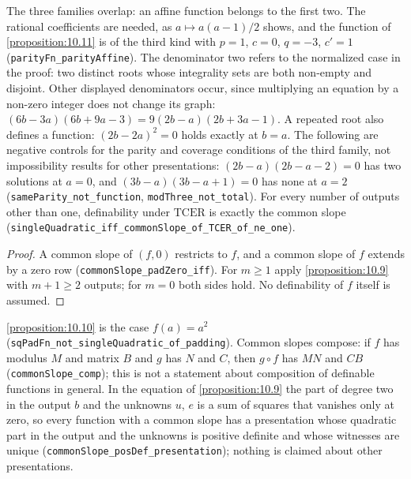The three families overlap: an affine function belongs to the first two. The rational coefficients are needed, as $a ↦ a(a - 1)/2$ shows, and the function of \cref{proposition:10.11} is of the third kind with $p = 1$, $c = 0$, $q = -3$, $c' = 1$ (\texttt{parityFn\_parityAffine}). The denominator two refers to the normalized case in the proof: two distinct roots whose integrality sets are both non-empty and disjoint. Other displayed denominators occur, since multiplying an equation by a non-zero integer does not change its graph: $(6b - 3a)(6b + 9a - 3) = 9(2b - a)(2b + 3a - 1)$. A repeated root also defines a function: $(2b - 2a)^{2} = 0$ holds exactly at $b = a$. The following are negative controls for the parity and coverage conditions of the third family, not impossibility results for other presentations: $(2b - a)(2b - a - 2) = 0$ has two solutions at $a = 0$, and $(3b - a)(3b - a + 1) = 0$ has none at $a = 2$ (\texttt{sameParity\_not\_function}, \texttt{modThree\_not\_total}). For every number of outputs other than one, definability under $\mathrm{TCER}$ is exactly the common slope (\texttt{singleQuadratic\_iff\_commonSlope\_of\_TCER\_of\_ne\_one}).


\begin{proof}
A common slope of $(f, 0)$ restricts to $f$, and a common slope of $f$ extends by a zero row (\texttt{commonSlope\_padZero\_iff}). For $m ≥ 1$ apply \cref{proposition:10.9} with $m + 1 ≥ 2$ outputs; for $m = 0$ both sides hold. No definability of $f$ itself is assumed.
\end{proof}

\cref{proposition:10.10} is the case $f(a) = a^{2}$ (\texttt{sqPadFn\_not\_singleQuadratic\_of\_padding}). Common slopes compose: if $f$ has modulus $M$ and matrix $B$ and $g$ has $N$ and $C$, then $g ∘ f$ has $MN$ and $CB$ (\texttt{commonSlope\_comp}); this is not a statement about composition of definable functions in general. In the equation of \cref{proposition:10.9} the part of degree two in the output $b$ and the unknowns $u$, $e$ is a sum of squares that vanishes only at zero, so every function with a common slope has a presentation whose quadratic part in the output and the unknowns is positive definite and whose witnesses are unique (\texttt{commonSlope\_posDef\_presentation}); nothing is claimed about other presentations.

